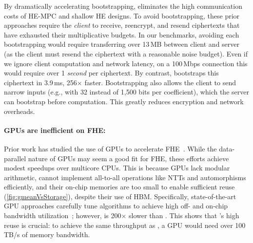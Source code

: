 By dramatically accelerating bootstrapping, \name eliminates the high
communication costs of HE-MPC and shallow HE designs. To avoid bootstrapping,
these prior approaches require the \emph{client} to receive, reencrypt, and
resend ciphertexts that have exhausted their multiplicative budgets. In our
benchmarks, avoiding each bootstrapping would require transferring over 13\,MB
between client and server (as the client must resend the ciphertext with a
reasonable noise budget). Even if we ignore client computation and network
latency, on a 100\,Mbps connection this would require over 1 \emph{second} per
ciphertext. By contrast, \name bootstraps this ciphertext in 3.9\,ms,
256$\times$ faster. Bootstrapping also allows the client to send narrow inputs
(e.g., with 32 instead of 1,500 bits per coefficient), which the server can
bootstrap before computation. This greatly reduces encryption and network
overheads.

\paragraph{GPUs are inefficient on FHE:}
Prior work has studied the use of GPUs to accelerate
FHE~\cite{wang:hpec12:fhe-gpu,wang:tc13:fhe-gpu,wang:iscas14:leveled-gpu,al:emerging19:implementation,jung2021over}.
While the data-parallel nature of GPUs may seem a good fit for FHE, these
efforts achieve modest speedups over multicore CPUs. This is because GPUs lack
modular arithmetic, cannot implement all-to-all operations like NTTs and
automorphisms efficiently, and their on-chip memories are too small to enable
sufficient reuse (\autoref{fig:gmeanVsStorage}), despite their use of HBM.
Specifically, state-of-the-art GPU approaches carefully tune algorithms to
achieve high off- and on-chip bandwidth utilization~\cite{jung2021over};
however, \cite{jung2021over} is 200$\times$ slower than \name. This shows that
\name's high reuse is crucial: to achieve the same throughput as \name, a GPU
would need over 100\,TB/s of memory bandwidth.
